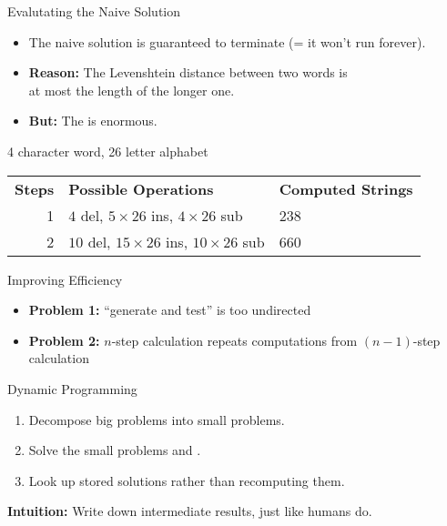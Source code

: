 \documentclass[professionalfonts, xcolor={usenames,svgnames,x11names,table}]{beamer}
\begin{document}
\begin{frame}{Evalutating the Naive Solution}
    \begin{itemize}
        \item The naive solution is guaranteed to terminate (= it won't run forever).
        \item \textbf{Reason:} The Levenshtein distance between two words is\\
            at most the length of the longer one.
        \item \textbf{But:} The  is enormous.
    \end{itemize}
    \begin{example}
        4 character word, 26 letter alphabet

        \medskip
        \centering
        \begin{tabular}{rll}
            \textbf{Steps} & \textbf{Possible Operations} & \textbf{Computed Strings}\\
            1 & $4$ del, $5 \times 26$ ins, $4 \times 26$ sub& 238\\
            2 & $10$ del, $15 \times 26$ ins, $10 \times 26$ sub& 660\\
        \end{tabular}
    \end{example}
\end{frame}

\begin{frame}{Improving Efficiency}
    \begin{itemize}
        \item \textbf{Problem 1:} ``generate and test'' is too undirected
        \item \textbf{Problem 2:} $n$-step calculation repeats computations from $(n-1)$-step calculation
    \end{itemize}
    \begin{block}{Dynamic Programming}
        \begin{enumerate}
            \item Decompose big problems into small problems.
            \item Solve the small problems and .
            \item Look up stored solutions rather than recomputing them.
        \end{enumerate}

        \textbf{Intuition:} Write down intermediate results, just like humans do.
    \end{block}
\end{frame}
\end{document}
